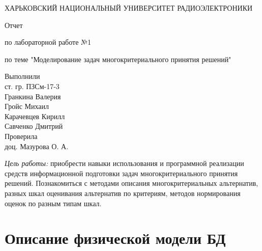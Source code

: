 \documentclass[titlepage]{article}
\newcommand{\goal}[1]{\textit{Цель работы:} #1}
\begin{document}
\begin{titlepage}
\begin{center}
\MakeUppercase{Харьковский национальный университет радиоэлектроники}

\vspace*{\fill}
Отчет

по лабораторной работе №1

по теме "Моделирование задач многокритериального принятия решений"

\end{center}
\vspace{20mm}
\hfill
\begin{varwidth}{\linewidth}
Выполнили\\
ст. гр. ПЗСм-17-3\\
Гранкина Валерия\\
Гройс Михаил\\
Карачевцев Кирилл\\
Савченко Дмитрий\\

Проверила\\
доц. Мазурова О. А.
\end{varwidth}
\vspace*{\fill}

\end{titlepage}
\goal{приобрести навыки использования и программной реализации средств информационной подготовки задач многокритериального принятия решений. Познакомиться с методами описания многокритериальных альтернатив, разных шкал оценивания альтернатив по критериям, методов нормирования оценок по разным типам шкал.}
\section*{Описание физической модели БД}
\end{document}
